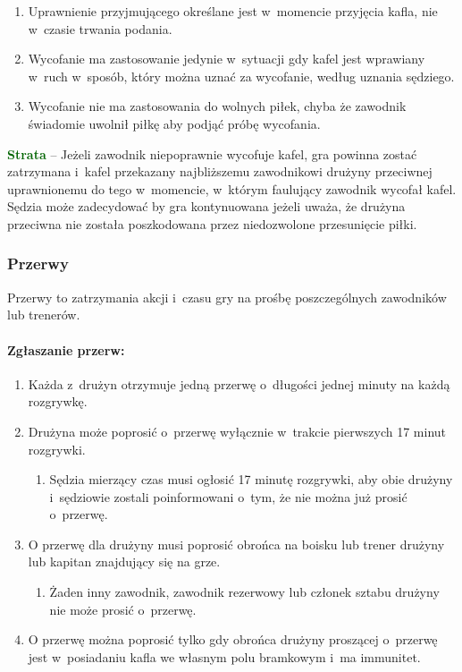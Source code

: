 \documentclass[12pt]{article}
\newcommand\other[1]{\bgroup\textcolor{darkgreen}{\textbf{#1}}}
\begin{document}
\begin{enumerate}
	\item
	      Uprawnienie przyjmującego określane jest w~momencie przyjęcia kafla,
	      nie w~czasie trwania podania.
	\item
	      Wycofanie ma zastosowanie jedynie w~sytuacji gdy kafel jest wprawiany
	      w~ruch w~sposób, który można uznać za wycofanie, według uznania
	      sędziego.
	\item
	      Wycofanie nie ma zastosowania do wolnych piłek, chyba że zawodnik
	      świadomie uwolnił piłkę aby podjąć próbę wycofania.
\end{enumerate}

\other{Strata} -- Jeżeli zawodnik niepoprawnie wycofuje kafel, gra powinna
zostać zatrzymana i~kafel przekazany najbliższemu zawodnikowi drużyny
przeciwnej uprawnionemu do tego w~momencie, w~którym faulujący zawodnik
wycofał kafel. Sędzia może zadecydować by gra kontynuowana jeżeli uważa,
że drużyna przeciwna nie została poszkodowana przez niedozwolone
przesunięcie piłki.

\subsubsection{Przerwy}

Przerwy to zatrzymania akcji i~czasu gry na prośbę poszczególnych
zawodników lub trenerów.

\paragraph{Zgłaszanie przerw:}

\begin{enumerate}
	\item
	      Każda z~drużyn otrzymuje jedną przerwę o~długości jednej minuty na
	      każdą rozgrywkę.
	\item
	      Drużyna może poprosić o~przerwę wyłącznie w~trakcie pierwszych 17
	      minut rozgrywki.

	      \begin{enumerate}
		      \item
		            Sędzia mierzący czas musi ogłosić 17 minutę rozgrywki, aby obie
		            drużyny i~sędziowie zostali poinformowani o~tym, że nie można już
		            prosić o~przerwę.
	      \end{enumerate}
	\item
	      O przerwę dla drużyny musi poprosić obrońca na boisku lub trener
	      drużyny lub kapitan znajdujący się na grze.

	      \begin{enumerate}
		      \item
		            Żaden inny zawodnik, zawodnik rezerwowy lub członek sztabu drużyny
		            nie może prosić o~przerwę.
	      \end{enumerate}
	\item
	      O przerwę można poprosić tylko gdy obrońca drużyny proszącej o~przerwę
	      jest w~posiadaniu kafla we własnym polu bramkowym i~ma immunitet.
\end{enumerate}
\end{document}

